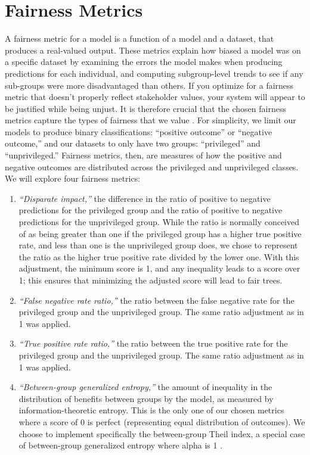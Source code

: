 \documentclass[twoside]{article}
\begin{document}
\section{Fairness Metrics}
A fairness metric for a model is a function of a model and a dataset, that produces a real-valued output. These metrics explain how biased a model was on a specific dataset by examining the errors the model makes when producing predictions for each individual, and computing subgroup-level trends to see if any sub-groups were more disadvantaged than others. If you optimize for a fairness metric that doesn’t properly reflect stakeholder values, your system will appear to be justified while being unjust. It is therefore crucial that the chosen fairness metrics capture the types of fairness that we value \citep{Binns:2017}. For simplicity, we limit our models to produce binary classifications: “positive outcome” or “negative outcome,” and our datasets to only have two groups: “privileged” and “unprivileged.” Fairness metrics, then, are measures of how the positive and negative outcomes are distributed across the privileged and unprivileged classes. We will explore four fairness metrics:

\begin{enumerate}
\item
\textit{“Disparate impact,”} the difference in the ratio of positive to negative predictions for the privileged group and the ratio of positive to negative predictions for the unprivileged group. While the ratio is normally conceived of as being greater than one if the privileged group has a higher true positive rate, and less than one is the unprivileged group does, we chose to represent the ratio as the higher true positive rate divided by the lower one. With this adjustment, the minimum score is 1, and any inequality leads to a score over 1; this ensures that minimizing the adjusted score will lead to fair trees.
\item 
\textit{“False negative rate ratio,”} the ratio between the false negative rate for the privileged group and the unprivileged group. The same ratio adjustment as in 1 was applied.
\item 
\textit{“True positive rate ratio,”} the ratio between the true positive rate for the privileged group and the unprivileged group. The same ratio adjustment as in 1 was applied.
\item 
\textit{“Between-group generalized entropy,”} the amount of inequality in the distribution of benefits between groups by the model, as measured by information-theoretic entropy. This is the only one of our chosen metrics where a score of 0 is perfect (representing equal distribution of outcomes). We choose to implement specifically the between-group Theil index, a special case of between-group generalized entropy where alpha is 1 \citep{Speicher:2018}.
\end{enumerate}
\end{document}
